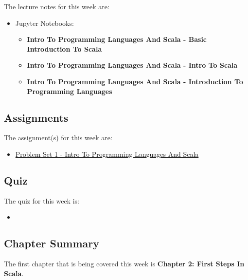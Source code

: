 \noindent The lecture notes for this week are:

\begin{itemize}
    \item Jupyter Notebooks:
    \begin{itemize}
        \item \textbf{Intro To Programming Languages And Scala - Basic Introduction To Scala}
        \item \textbf{Intro To Programming Languages And Scala - Intro To Scala}
        \item \textbf{Intro To Programming Languages And Scala - Introduction To Programming Languages}
    \end{itemize}
\end{itemize}

\subsection{Assignments}

The assignment(s) for this week are:

\begin{itemize}
    \item \href{https://github.com/QuantumCompiler/CU/tree/main/CSPB%203155%20-%20Principles%20Of%20Programming%20Languages/Assignments/Problem%20Sets/Problem%20Set%201%20-%20Intro%20To%20Programming%20Languages%20And%20Scala}{Problem Set 1 - Intro To Programming Languages And Scala}
\end{itemize}

\subsection{Quiz}

The quiz for this week is:

\begin{itemize}
    \item {}
\end{itemize}

\newpage

\subsection{Chapter Summary}

The first chapter that is being covered this week is \textbf{Chapter 2: First Steps In Scala}.


